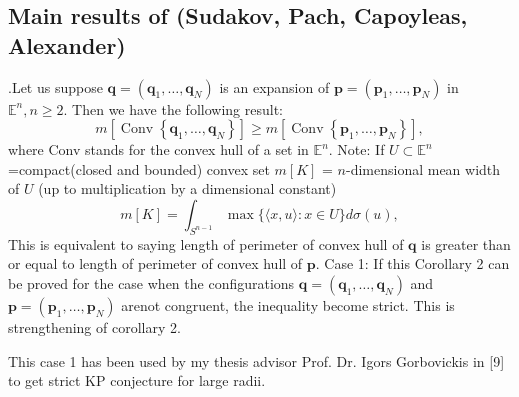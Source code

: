 \subsection{Main results of (Sudakov, Pach, Capoyleas, Alexander)}
.Let us suppose $\mathbf{q}=\left(\mathbf{q}_{1}, \ldots, \mathbf{q}_{N}\right)$ is an expansion of $\mathbf{p}=\left(\mathbf{p}_{1}, \ldots, \mathbf{p}_{N}\right)$ in $\mathbb{E}^{n}, n \geq 2$. Then we have the following result:
$$
m\left[\operatorname{Conv}\left\{\mathbf{q}_{1}, \ldots, \mathbf{q}_{N}\right\}\right] \geq m\left[\operatorname{Conv}\left\{\mathbf{p}_{1}, \ldots, \mathbf{p}_{N}\right\}\right],
$$
where Conv stands for the convex hull of a set in $\mathbb{E}^{n}$.
Note:
 If $U \subset \mathbb{E}^{n}$ =compact(closed and bounded) convex set
 $m[K]$ = $n$-dimensional mean width of $U$ (up to multiplication by a dimensional constant)
$$
m[K]=\int_{S^{n-1}} \max \{\langle x, u\rangle: x \in U\} d \sigma(u),
$$
This is equivalent to saying  length of  perimeter of convex hull of $\boldsymbol{q}$ is greater than or equal to  length of perimeter of  convex hull of $\boldsymbol{p}$.
Case 1: If this Corollary 2 can be proved for the case when the configurations $\mathbf{q}=\left(\mathbf{q}_{1}, \ldots, \mathbf{q}_{N}\right)$ and $\mathbf{p}=\left(\mathbf{p}_{1}, \ldots, \mathbf{p}_{N}\right)$ arenot congruent, the inequality become strict. This is strengthening of corollary 2.

This case 1 has been used by my thesis advisor Prof. Dr. Igors Gorbovickis in [9] to get strict KP conjecture for large radii.
